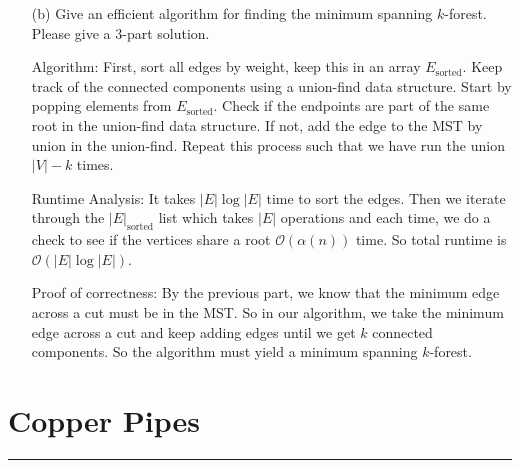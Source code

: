 \documentclass{article}
\begin{document}
\begin{itemize}
        \item [(b)] Give an efficient algorithm for finding the minimum spanning $k$-forest. Please give a $3$-part solution.
            \begin{answer}
                Algorithm: First, sort all edges by weight, keep this in an array $E_{\text{sorted}}$. Keep track of the connected components using a union-find data structure. Start by popping elements from $E_{\text{sorted}}$. Check if the endpoints are part of the same root in the union-find data structure. If not, add the edge to the MST by union in the union-find. Repeat this process such that we have run the union $\lvert V \rvert - k$ times.

                Runtime Analysis: It takes $\lvert E \rvert \log{\lvert E \rvert}$ time to sort the edges. Then we iterate through the $\lvert E \rvert_{\text{sorted}}$ list which takes $\lvert E \rvert$ operations and each time, we do a check to see if the vertices share a root $\mathcal{O}(\alpha(n))$ time. So total runtime is $\mathcal{O}(\lvert E \rvert\log{\lvert E \rvert})$.

                Proof of correctness: By the previous part, we know that the minimum edge across a cut must be in the MST. So in our algorithm, we take the minimum edge across a cut and keep adding edges until we get $k$ connected components. So the algorithm must yield a minimum spanning $k$-forest.
            \end{answer}
    \end{itemize}

\newpage
\section*{Copper Pipes}
\hrule
\end{document}
